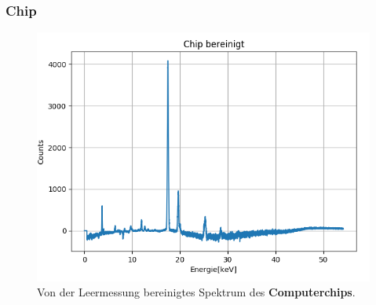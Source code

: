 \documentclass[12pt,a4paper]{article}
\begin{document}
\subsubsection{Chip}
\begin{figure}[H]
\centering
\includegraphics[scale=1]{Bilder/roentgen_spektren/chip_0.png}
\caption{Von der Leermessung bereinigtes Spektrum des \textbf{Computerchips}.}
\label{fig:prop_chip}
\end{figure}
\end{document}
